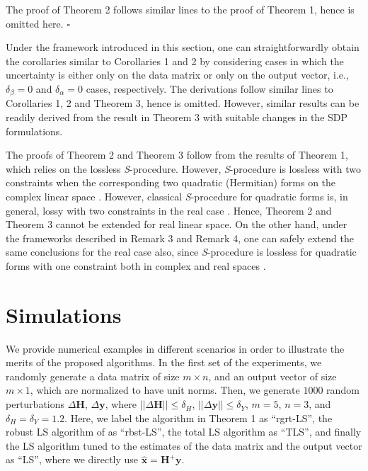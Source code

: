 \documentclass[review,sort&compress]{elsarticle}
\renewcommand{\vec}[1]{\mbox{$\mathbf{#1}$}}
\newcommand{\norm}[1]{\left|\left|#1\right|\right|}
\newcommand{\vH}{\vec{H}}
\newcommand{\vx}{\vec{x}}
\newcommand{\vy}{\vec{y}}
\newcommand{\dH}{\Delta\vH}
\newcommand{\dy}{\Delta\vy}
\begin{document}
\begin{pot3}
The proof of Theorem 2 follows similar lines to the proof of Theorem 1, hence is omitted here. \hfill $\square$
\end{pot3}

\begin{rmk}
Under the framework introduced in this section, one can straightforwardly obtain the corollaries similar to Corollaries 1 and 2 by considering cases in which the uncertainty is either only on the data matrix or only on the output vector, i.e., $\delta_{\beta} = 0$ and $\delta_{\alpha} = 0$ cases, respectively. The derivations follow similar lines to Corollaries 1, 2 and Theorem 3, hence is omitted. However, similar results can be readily derived from the result in Theorem 3 with suitable changes in the SDP formulations.
\end{rmk}

\begin{rmk}
The proofs of Theorem 2 and Theorem 3 follow from the results of Theorem 1, which relies on the lossless {\em S}-procedure. However, {\em S}-procedure is lossless with two constraints when the corresponding two quadratic (Hermitian) forms on the complex linear space \cite{s1}. However, classical {\em S}-procedure for quadratic forms is, in general, lossy with two constraints in the real case \cite{s2}. Hence, Theorem 2 and Theorem 3 cannot be extended for real linear space. On the other hand, under the frameworks described in Remark 3 and Remark 4, one can safely extend the same conclusions for the real case also, since {\em S}-procedure is lossless for quadratic forms with one constraint both in complex and real spaces \cite{huang1,huang2}.
\end{rmk}

\section{Simulations}\label{sec:numer}
We provide numerical examples in different scenarios in order to illustrate the merits of the proposed algorithms. In the first set of the experiments, we randomly generate a data matrix of size $m \times n$, and an output vector of size $m\times 1$, which are normalized to have unit norms. Then, we generate $1000$ random perturbations $\dH$, $\dy$, where $\norm{\dH}\leq \delta_H$, $\norm{\dy}\leq \delta_Y$, $m=5$, $n=3$, and $\delta_H=\delta_Y=1.2$. Here, we label the algorithm in Theorem 1 as ``rgrt-LS'', the robust LS algorithm of \cite{Ghaoui97} as ``rbst-LS'', the total LS algorithm \cite{Ghaoui97} as ``TLS'', and finally the LS algorithm tuned to the estimates of the data matrix and the output vector as ``LS'', where we directly use $\hat{\vx} = \vH^+ \vy$.
\end{document}
